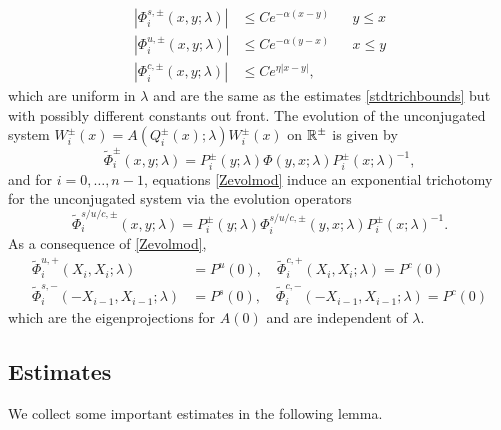 \documentclass[10pt,reqno]{amsart}
\theoremstyle{plain}
\theoremstyle{definition}
\theoremstyle{remark}
\numberwithin{theorem}{section}
\numberwithin{equation}{section}
\begin{document}
\begin{equation}\label{Zevolbounds}
\begin{aligned}
|\Phi_i^{s,\pm}(x, y; \lambda)| &\leq C e^{-\alpha(x - y)} && y \leq x \\
|\Phi_i^{u,\pm}(x, y; \lambda)| &\leq C e^{-\alpha(y - x)} && x \leq y \\
|\Phi_i^{c,\pm}(x, y; \lambda)| &\leq C e^{\eta|x - y|},
\end{aligned}
\end{equation}
which are uniform in $\lambda$ and are the same as the estimates \cref{stdtrichbounds} but with possibly different constants out front. The evolution of the unconjugated system $W_i^\pm(x) = A(Q_i^\pm(x); \lambda) W_i^\pm(x)$ on $\mathbb{R}^\pm$ is given by
\begin{equation}\label{unconjevol2}
\tilde{\Phi}_i^\pm(x, y; \lambda) = P_i^\pm(y; \lambda) \Phi(y, x; \lambda) P_i^\pm(x; \lambda)^{-1},
\end{equation}
and for $i = 0, \dots, n-1$, equations \cref{Zevolmod} induce an exponential trichotomy for the unconjugated system via the evolution operators
\begin{equation}\label{trichunconj}
\tilde{\Phi}_i^{s/u/c,\pm}(x, y; \lambda) = P_i^\pm(y; \lambda) \Phi_i^{s/u/c,\pm}(y, x; \lambda) P_i^\pm(x; \lambda)^{-1}.
\end{equation}
As a consequence of \cref{Zevolmod},
\begin{align*}
\tilde{\Phi}_i^{u,+}(X_i, X_i ; \lambda) &= P^u(0), \quad
\tilde{\Phi}_i^{c,+}(X_i, X_i ; \lambda) = P^c(0) \\
\tilde{\Phi}_i^{s,-}(-X_{i-1}, X_{i-1} ; \lambda) &= P^s(0), \quad
\tilde{\Phi}_i^{c,-}(-X_{i-1}, X_{i-1} ; \lambda) = P^c(0)
\end{align*}
which are the eigenprojections for $A(0)$ and are independent of $\lambda$.

\subsection{Estimates}

We collect some important estimates in the following lemma.
\end{document}
